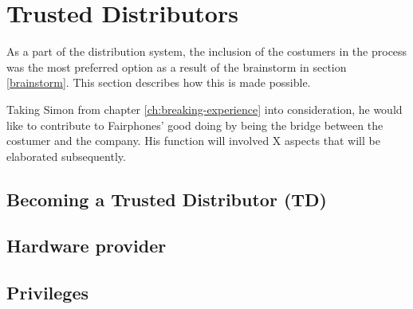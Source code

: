 \documentclass[final]{scrreprt} %
\begin{document}
\chapter{Trusted Distributors}
\label{ch:trusted-distributors}
As a part of the distribution system, the inclusion of the costumers in the process was the most preferred option as a result of the brainstorm in section \ref{brainstorm}. This section describes how this is made possible.

Taking Simon from chapter \ref{ch:breaking-experience} into consideration, he would like to contribute to Fairphones' good doing by being the bridge between the costumer and the company. His function will involved X aspects that will be elaborated subsequently.

\section{Becoming a Trusted Distributor (TD)}


\section{Hardware provider}

\section{Privileges} 

\end{document}
